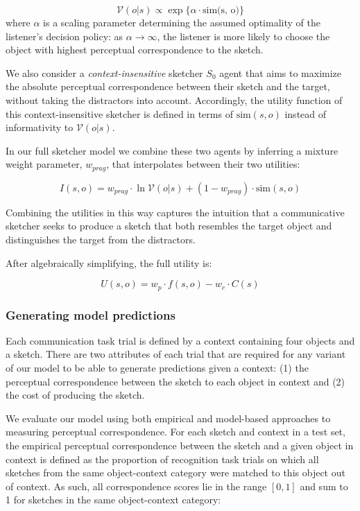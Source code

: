 \documentclass[9pt,twocolumn,twoside]{pnas-new}
\begin{document}
{\begin{equation} 
\mathcal{V}(o|s) \propto \exp\{\alpha \cdot \textrm{sim(s, o)}\}
\end{equation}
where $\alpha$ is a scaling parameter determining the assumed optimality of the listener's decision policy: as $\alpha \rightarrow \infty$, the listener is more likely to choose the object with highest perceptual correspondence to the sketch.

We also consider a \textit{context-insensitive} sketcher $S_0$ agent that aims to maximize the absolute perceptual correspondence between their sketch and the target, without taking the  distractors into account. Accordingly, the utility function of this context-insensitive sketcher is defined in terms of $\textrm{sim}(s,o)$ instead of informativity to $\mathcal{V}(o|s)$.

In our full sketcher model we combine these two agents by inferring a mixture weight parameter, $w_{prag}$, that interpolates between their two utilities:  

\begin{equation} 
I(s,o) = w_{prag} \cdot \ln \mathcal{V}(o | s) + (1-w_{prag}) \cdot \textrm{sim}(s,o)
\end{equation}

Combining the utilities in this way captures the intuition that a communicative sketcher seeks to produce a sketch that both resembles the target object and distinguishes the target from the distractors.

After algebraically simplifying, the full utility is:

\begin{equation}
U(s,o) =  w_p \cdot  f(s,o) - w_c \cdot C(s)
\end{equation}

\subsubsection*{Generating model predictions}

Each communication task trial is defined by a context containing four objects and a sketch. There are two attributes of each trial that are required for any variant of our model to be able to generate predictions given a context: (1) the perceptual correspondence between the sketch to each object in context and (2) the cost of producing the sketch.

We evaluate our model using both empirical and model-based approaches to measuring perceptual correspondence. For each sketch and context in a test set, the empirical perceptual correspondence between the sketch and a given object in context is defined as the proportion of recognition task trials on which all sketches from the same object-context category were matched to this object out of context. As such, all correspondence scores lie in the range $[0,1]$ and sum to 1 for sketches in the same object-context category:

}
\end{document}
